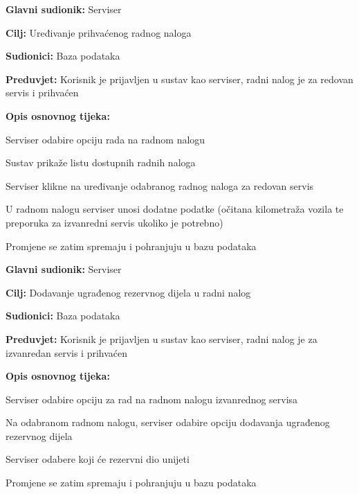 \noindent {}
\begin{packed_item}

	\item \textbf{Glavni sudionik: } Serviser
	\item  \textbf{Cilj:} Uređivanje prihvaćenog radnog naloga
	\item  \textbf{Sudionici:} Baza podataka
	\item  \textbf{Preduvjet:} Korisnik je prijavljen u sustav kao serviser, radni nalog je
	za redovan servis i prihvaćen
	\item  \textbf{Opis osnovnog tijeka:}

	\item[] \begin{packed_enum}

		\item Serviser odabire opciju rada na radnom nalogu
		\item Sustav prikaže listu dostupnih radnih naloga
		\item Serviser klikne na uređivanje odabranog radnog naloga za redovan
		servis
		\item U radnom nalogu serviser unosi dodatne podatke (očitana kilometraža
		vozila te preporuka za izvanredni servis ukoliko je potrebno)
		\item Promjene se zatim spremaju i pohranjuju u bazu podataka

	\end{packed_enum}
\end{packed_item}

\noindent {}
\begin{packed_item}

	\item \textbf{Glavni sudionik: } Serviser
	\item  \textbf{Cilj:} Dodavanje ugrađenog rezervnog dijela u radni nalog
	\item  \textbf{Sudionici:} Baza podataka
	\item  \textbf{Preduvjet:} Korisnik je prijavljen u sustav kao serviser, radni nalog je
	za izvanredan servis i prihvaćen
	\item  \textbf{Opis osnovnog tijeka:}

	\item[] \begin{packed_enum}

		\item Serviser odabire opciju za rad na radnom nalogu izvanrednog servisa
		\item Na odabranom radnom nalogu, serviser odabire opciju dodavanja ugrađenog rezervnog dijela
		\item Serviser odabere koji će rezervni dio unijeti
		\item Promjene se zatim spremaju i pohranjuju u bazu podataka

	\end{packed_enum}
\end{packed_item}

